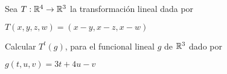 \item Sea $T:\mathbb{R}^4\to\mathbb{R}^3$ la transformación lineal dada por
    \begin{center}
        $T(x,y,z,w)=(x-y,x-z,x-w)$
    \end{center}
    Calcular $T^t(g)$, para el funcional lineal $g$ de $\mathbb{R}^3$ dado por
    \begin{center}
        $g(t,u,v)=3t+4u-v$
    \end{center}
    \begin{mdframed}[style=s]
        
    \end{mdframed}